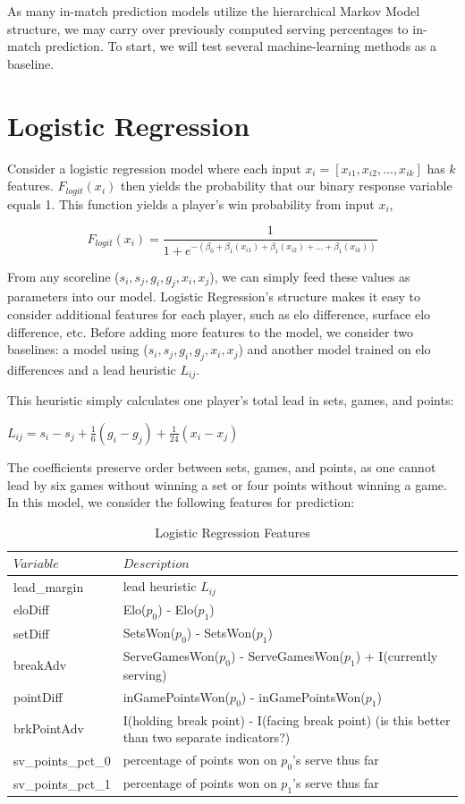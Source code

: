 \documentclass[chapterprefix=false]{report}
\begin{document}
As many in-match prediction models utilize the hierarchical Markov Model structure, we may carry over previously computed serving percentages to in-match prediction. To start, we will test several machine-learning methods as a baseline.

\section{Logistic Regression}

Consider a logistic regression model where each input $x_i = [x_{i1},x_{i2},...,x_{ik}]$ has $k$ features. $F_{logit}(x_i)$ then yields the probability that our binary response variable equals 1. This function yields a player's win probability from input $x_i$,

$$F_{logit}(x_i) = \frac{1}{1+e^{-(\beta_0+\beta_1(x_{i1})+\beta_1(x_{i2})+...+\beta_1(x_{ik}))}}$$

From any scoreline  ($s_i,s_j,g_i,g_j,{x}_i,{x}_j$), we can simply feed these values as parameters into our model. Logistic Regression's structure makes it easy to consider additional features for each player, such as elo difference, surface elo difference, etc. Before adding more features to the model, we consider two baselines: a model using ($s_i,s_j,g_i,g_j,{x}_i,{x}_j$) and another model trained on elo differences and a lead heuristic $L_{ij}$.

This heuristic simply calculates one player's total lead in sets, games, and points:

$L_{ij} = s_i-s_j + \frac{1}{6}(g_i-g_j) + \frac{1}{24}(x_i-x_j)$

The coefficients preserve order between sets, games, and points, as one cannot lead by six games without winning a set or four points without winning a game. In this model, we consider the following features for prediction:

\begin{table}[H]
\centering
\caption{Logistic Regression Features}
\label{my-label}
\begin{tabular}{ll}
 \hline
 $Variable$ & $Description$ \\
 \hline
 lead\_margin & lead heuristic $L_{ij}$ \\
 \hline
 eloDiff &  Elo($p_0$) - Elo($p_1$) \\
 \hline
 setDiff &  SetsWon($p_0$) - SetsWon($p_1$)\\
 \hline
 breakAdv &  ServeGamesWon($p_0$) - ServeGamesWon($p_1$) + I(currently serving)\\
 \hline
 pointDiff &  inGamePointsWon($p_0$) - inGamePointsWon($p_1$)\\
 \hline
 brkPointAdv & I(holding break point) - I(facing break point) (is this better than two separate indicators?)\\
 \hline
 sv\_points\_pct\_0 & percentage of points won on $p_0$'s serve thus far\\
 \hline
 sv\_points\_pct\_1 & percentage of points won on $p_1$'s serve thus far\\
 \hline
\end{tabular}
\end{table}
\end{document}

